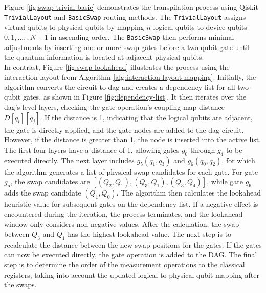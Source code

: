Figure \ref{fig:swap-trivial-basic} demonstrates the transpilation process using Qiskit \lstinline{TrivialLayout} \cite{ibmquantum_triviallayout} and \lstinline{BasicSwap} \cite{ibmquantum_basicswap} routing methods. The \lstinline{TrivialLayout} assigns virtual qubits to physical qubits by mapping $n$ logical qubits to device qubits $0, 1, ...,, N-1$ in ascending order. The \lstinline{BasicSwap} then performs minimal adjustments by inserting one or more swap gates before a two-qubit gate until the quantum information is located at adjacent physical qubits. \\
In contrast, Figure \ref{fig:swap-lookahead} illustrates the process using the interaction layout from Algorithm \ref{alg:interaction-layout-mapping}. Initially, the algorithm converts the circuit to \acrshort{dag} and creates a dependency list for all two-qubit gates, as shown in Figure \ref{fig:dependency-list}. It then iterates over the \acrshort{dag}'s level layers, checking the gate operation's coupling map distance $D[q_i][q_j]$. If the distance is 1, indicating that the logical qubits are adjacent, the gate is directly applied, and the gate nodes are added to the \acrshort{dag} circuit. However, if the distance is greater than 1, the node is inserted into the active list. \\
The first four layers have a distance of 1, allowing gates $g_0$ through $g_4$ to be executed directly. The next layer includes $g_5 (q_1, q_3)$ and $g_6 (q_0, q_2)$, for which the algorithm generates a list of physical swap candidates for each gate. For gate $g_5$, the swap candidates are $[(Q_2, Q_1), (Q_3, Q_1), (Q_3, Q_4)]$, while gate $g_6$ adds the swap candidate $(Q_1, Q_0)$. The algorithm then calculates the lookahead heuristic value for subsequent gates on the dependency list. If a negative effect is encountered during the iteration, the process terminates, and the lookahead window only considers non-negative values. After the calculation, the swap between $Q_3$ and $Q_1$ has the highest lookahead value. The next step is to recalculate the distance between the new swap positions for the gates. If the gates can now be executed directly, the gate operation is added to the DAG. The final step is to determine the order of the measurement operations to the classical registers, taking into account the updated logical-to-physical qubit mapping after the swaps.

